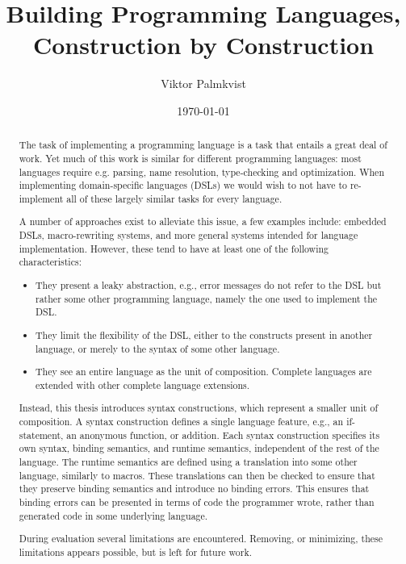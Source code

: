 \documentclass{kththesis}
\title{Building Programming Languages, Construction by Construction}
\author{Viktor Palmkvist}
\date{\today}
\begin{document}
\frontmatter

\titlepage

\begin{abstract}
The task of implementing a programming language is a task that entails a great deal of work. Yet much of this work is similar for different programming languages: most languages require e.g. parsing, name resolution, type-checking and optimization. When implementing domain-specific languages (DSLs) we would wish to not have to re-implement all of these largely similar tasks for every language.

A number of approaches exist to alleviate this issue, a few examples include: embedded DSLs, macro-rewriting systems, and more general systems intended for language implementation. However, these tend to have at least one of the following characteristics:

\begin{itemize}
  \item They present a leaky abstraction, e.g., error messages do not refer to the DSL but rather some other programming language, namely the one used to implement the DSL.
  \item They limit the flexibility of the DSL, either to the constructs present in another language, or merely to the syntax of some other language.
  \item They see an entire language as the unit of composition. Complete languages are extended with other complete language extensions.
\end{itemize}

Instead, this thesis introduces syntax constructions, which represent a smaller unit of composition. A syntax construction defines a single language feature, e.g., an if-statement, an anonymous function, or addition. Each syntax construction specifies its own syntax, binding semantics, and runtime semantics, independent of the rest of the language. The runtime semantics are defined using a translation into some other language, similarly to macros. These translations can then be checked to ensure that they preserve binding semantics and introduce no binding errors. This ensures that binding errors can be presented in terms of code the programmer wrote, rather than generated code in some underlying language.

\enlargethispage{\baselineskip}

During evaluation several limitations are encountered. Removing, or minimizing, these limitations appears possible, but is left for future work.
\end{abstract}
\end{document}
